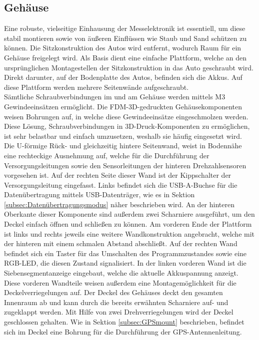 \subsection{Gehäuse}
\label{subsec:elekCasing}
Eine robuste, vielseitige Einhausung der Messelektronik ist essentiell, um diese stabil montieren sowie von äußeren Einflüssen wie Staub und Sand schützen zu können. Die Sitzkonstruktion des Autos wird entfernt, wodurch Raum für ein Gehäuse freigelegt wird. Als Basis dient eine einfache Plattform, welche an den ursprünglichen Montagestellen der Sitzkonstruktion in das Auto geschraubt wird. Direkt darunter, auf der Bodenplatte des Autos, befinden sich die Akkus. Auf diese Plattform werden mehrere Seitenwände aufgeschraubt.\\
Sämtliche Schraubverbindungen im und am Gehäuse werden mittels M3 Gewindeeinsätzen ermöglicht. Die \ac{FDM}-3D-gedruckten Gehäusekomponenten weisen Bohrungen auf, in welche diese Gewindeeinsätze eingeschmolzen werden. Diese Lösung, Schraubverbindungen in 3D-Druck-Komponenten zu ermöglichen, ist sehr belastbar und einfach umzusetzen, weshalb sie häufig eingesetzt wird. \\
Die U-förmige Rück- und gleichzeitig hintere Seitenwand, weist in Bodennähe eine rechteckige Ausnehmung auf, welche für die Durchführung der Versorgungsleitungen sowie den Sensorleitungen der hinteren Drehzahlsensoren vorgesehen ist. Auf der rechten Seite dieser Wand ist der Kippschalter der Versorgungsleitung eingefasst. Links befindet sich die \ac{USB}-A-Buchse für die Datenübertragung mittels \ac{USB}-Datenträger, wie es in Sektion \ref{subsec:Datenübertragungsmodus} näher beschrieben wird. An der hinteren Oberkante dieser Komponente sind außerdem zwei Scharniere ausgeführt, um den Deckel einfach öffnen und schließen zu können. Am vorderen Ende der Plattform ist links und rechts jeweils eine weitere Wandkonstruktion angebracht, welche mit der hinteren mit einem schmalen Abstand abschließt. Auf der rechten Wand befindet sich ein Taster für das Umschalten des Programmzustandes sowie eine \ac{RGB}-\ac{LED}, die diesen Zustand signalisiert. In der linken vorderen Wand ist die Siebensegmentanzeige eingebaut, welche die aktuelle Akkuspannung anzeigt. Diese vorderen Wandteile weisen außerdem eine Montagemöglichkeit für die Deckelverriegelungen auf. Der Deckel des Gehäuses deckt den gesamten Innenraum ab und kann durch die bereits erwähnten Scharniere auf- und zugeklappt werden. Mit Hilfe von zwei Drehverriegelungen wird der Deckel geschlossen gehalten. Wie in Sektion \ref{subsec:GPSmount} beschrieben, befindet sich im Deckel eine Bohrung für die Durchführung der GPS-Antennenleitung.\\
